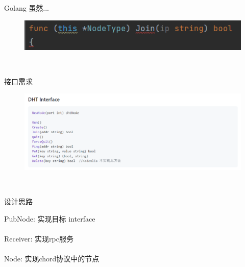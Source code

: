 \documentclass[10pt]{beamer}
\begin{document}
\begin{frame}{Golang}
虽然...

\begin{figure}
\centering
\includegraphics[scale=0.9]{figure/code2.png}
\end{figure}

\\[20pt]

\end{frame}

\begin{frame}{接口需求}

\begin{figure}
\includegraphics[scale=0.9]{figure/interface.png}
\end{figure}

\\[20pt]

\end{frame}

\begin{frame}{设计思路}

\alert{PubNode:} 实现目标 interface \\

\\[20pt]

\alert{Receiver:} 实现rpc服务 \\

\\[20pt]

\alert{Node:} 实现chord协议中的节点 \\

\\[20pt]

\end{frame}
\end{document}
